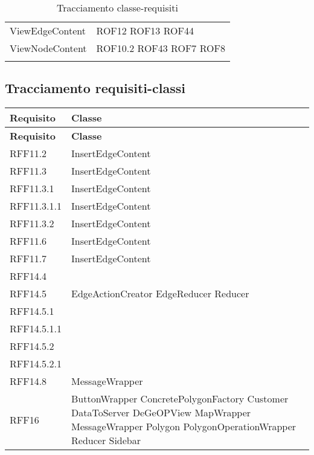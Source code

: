 \begin{longtable}{p{5cm}!{\VRule[1pt]}p{2.5cm}}
	ViewEdgeContent & ROF12 \newline ROF13 \newline ROF44\\
	ViewNodeContent & ROF10.2 \newline ROF43 \newline ROF7 \newline ROF8\\
	\caption{Tracciamento classe-requisiti}
\end{longtable}

\subsection{Tracciamento requisiti-classi}
\def\arraystretch{1.5}
\begin{longtable}{p{2.5cm}!{\VRule[1pt]}p{5cm}}
	\color{white} \textbf{Requisito} & \color{white} \textbf{Classe} \\ 
	\endfirsthead
	\color{white} \textbf{Requisito} & \color{white} \textbf{Classe} \\ 
	\endhead
	RFF11.2 & InsertEdgeContent\\
	RFF11.3 & InsertEdgeContent\\
	RFF11.3.1 & InsertEdgeContent\\
	RFF11.3.1.1 & InsertEdgeContent\\
	RFF11.3.2 & InsertEdgeContent\\
	RFF11.6 & InsertEdgeContent\\
	RFF11.7 & InsertEdgeContent\\
	RFF14.4 & \\
	RFF14.5 & EdgeActionCreator \newline EdgeReducer \newline Reducer\\
	RFF14.5.1 & \\
	RFF14.5.1.1 & \\
	RFF14.5.2 & \\
	RFF14.5.2.1 & \\
	RFF14.8 & MessageWrapper\\
	RFF16 & ButtonWrapper \newline ConcretePolygonFactory \newline Customer \newline DataToServer \newline DeGeOPView \newline MapWrapper \newline MessageWrapper \newline Polygon \newline PolygonOperationWrapper \newline Reducer \newline Sidebar\\

\end{longtable}
